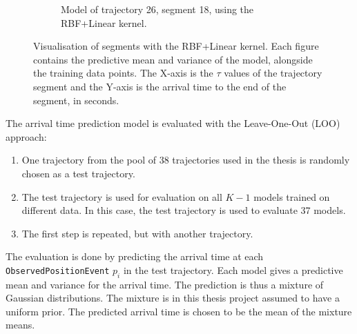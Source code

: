 \begin{figure}
\begin{subfigure}[b]{0.475\textwidth}
        \caption[]%
        {{\small Model of trajectory 26, segment 18, using the RBF+Linear kernel.}}    
        \label{fig:26-18-rbf-linear}
    \end{subfigure}
    \caption[ Visualisation of arbitrary segments with the RBF+Linear kernel ]
    {{\small Visualisation of segments with the RBF+Linear kernel.
    Each figure contains the predictive mean and variance of the model, alongside the training data points.  
    The X-axis is the $\tau$ values of the trajectory segment and the Y-axis is the arrival time to the end of the segment, in seconds.}} 
    \label{fig:good-kernel-results}
\end{figure}

The arrival time prediction model is evaluated with the Leave-One-Out (LOO) approach:
\begin{enumerate}
    \item One trajectory from the pool of 38 trajectories used in the thesis is randomly chosen as a test trajectory.
    \item The test trajectory is used for evaluation on all $K-1$ models trained on different data.
    In this case, the test trajectory is used to evaluate 37 models.
    \item The first step is repeated, but with another trajectory.
\end{enumerate}

The evaluation is done by predicting the arrival time at each \texttt{ObservedPositionEvent} $p_i$ in the test trajectory.
Each model gives a predictive mean and variance for the arrival time.
The prediction is thus a mixture of Gaussian distributions.
The mixture is in this thesis project assumed to have a uniform prior.
The predicted arrival time is chosen to be the mean of the mixture means.

